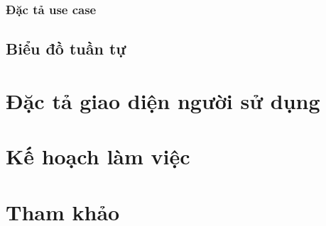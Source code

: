\documentclass[a4paper, 12pt]{article}
\begin{document}
    \subsubsection{Đặc tả use case}

    \subsection{Biểu đồ tuần tự}
    \clearpage

    \section{Đặc tả giao diện người sử dụng}
    \label{sec:describeUI}
    \clearpage

    \section{Kế hoạch làm việc}
    \label{sec:plan}
    \clearpage

    \section{Tham khảo}
    \label{sec:reference}
    \clearpage
\end{document}
